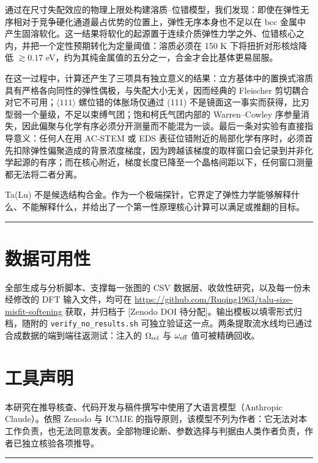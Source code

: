 通过在尺寸失配效应的物理上限处构建溶质--位错模型，我们发现：即使在弹性无序相对于竞争硬化通道最占优势的位置上，弹性无序本身也不足以在 bcc 金属中产生固溶软化。这一结果将软化的起源置于连续介质弹性力学之外、位错核心之内，并把一个定性预期转化为定量阈值：溶质必须在 150 K 下将扭折对形核焓降低 \(\gtrsim0.17\) eV，约为其纯金属值的五分之一，合金才会比基体更易屈服。

在这一过程中，计算还产生了三项具有独立意义的结果：立方基体中的置换式溶质具有严格各向同性的弹性偶极，与失配大小无关，因而经典的 Fleischer 剪切耦合对它不可用；\(\langle111\rangle\) 螺位错的体胀场仅通过 (111) 不是镜面这一事实而获得，比刃型弱一个量级，不足以束缚气团；饱和柯氏气团内部的 Warren--Cowley 序参量消失，因此偏聚与化学有序必须分开测量而不能混为一谈。最后一条对实验有直接指导意义：任何人在用 AC-STEM 或 EDS 表征位错附近的局部化学有序时，必须首先扣除弹性偏聚造成的背景浓度梯度，因为跨越该梯度的取样窗口会记录到并非化学起源的有序；而在核心附近，梯度长度已降至一个晶格间距以下，任何窗口测量都无法将二者分离。

Ta(Lu) 不是候选结构合金。作为一个极端探针，它界定了弹性力学能够解释什么、不能解释什么，并给出了一个第一性原理核心计算可以满足或推翻的目标。

\begin{center}\rule{0.5\linewidth}{0.5pt}\end{center}

\hypertarget{ux6570ux636eux53efux7528ux6027}{%
\section*{数据可用性}\label{sec:ux6570ux636eux53efux7528ux6027}}

全部生成与分析脚本、支撑每一张图的 CSV 数据层、收敛性研究，以及每一份未经修改的 DFT 输入文件，均可在 \url{https://github.com/Ruqing1963/talu-size-misfit-softening} 获取，并归档于 {[}Zenodo DOI 待分配{]}。输出模板以填零形式归档，随附的 \texttt{verify\_no\_results.sh} 可独立验证这一点。两条提取流水线均已通过合成数据的端到端往返测试：注入的 \(\Omega_{\rm rel}\) 与 \(\omega_{\rm eff}\) 值可被精确回收。

\hypertarget{ux5de5ux5177ux58f0ux660e}{%
\section*{工具声明}\label{sec:ux5de5ux5177ux58f0ux660e}}

本研究在推导核查、代码开发与稿件撰写中使用了大语言模型（Anthropic Claude）。依照 Zenodo 与 ICMJE 的指导原则，该模型不列为作者：它无法对本工作负责，也无法同意发表。全部物理论断、参数选择与判据由人类作者负责，作者已独立核验各项推导。

\begin{center}\rule{0.5\linewidth}{0.5pt}\end{center}
